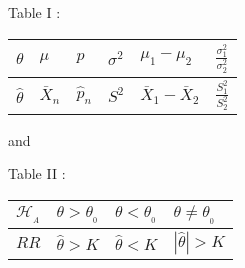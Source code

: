 \documentclass[14pt,twoside,a4paper,fleqn]{article}
\theoremstyle{plain}
\begin{document}
\begin{center}Table I : 
    \begin{tabular}{| l | l | l | l | l | l | }
    \hline
    $\theta$ & $\mu$ & $p$ & $\sigma^2$ & $\mu_1 - \mu_2$ &$ \frac{\sigma^2_1}{\sigma^2_2}$  \\ \hline
    $\hat{\theta}$ & $\bar{X}_n$ & $\hat{p}_n$ & $S^2$ & $\bar{X}_1 - \bar{X}_2$ &$\frac{S^2_1}{S^2_2}$  \\
    \hline
    \end{tabular}
\end{center}

and

\begin{center}Table II : 
    \begin{tabular}{| l | l | l | l |}
    \hline
    $\mathcal{H}_{_A}$ & $\theta > \theta_{_0}$ & $\theta < \theta_{_0}$ & $\theta \neq \theta_{_0}$  \\ \hline
    $RR$ & $\hat{\theta} > K$ & $\hat{\theta} < K$ & $| \hat{\theta}| > K$  \\
    \hline
    \end{tabular}
\end{center}
\end{document}
